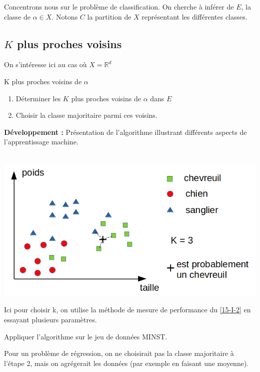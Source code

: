 Concentrons nous sur le problème de classification. On cherche à inférer de $E$, la classe de $\alpha \in X$. Notons $C$ la partition de $X$ représentant les différentes classes.

\subsection{$K$ plus proches voisins}

On s'intéresse ici au cas où $X = \mathbb R^d$

\begin{algo}
	K plus proches voisins de $\alpha$
	\begin{enumerate}
		\item Déterminer les $K$ plus proches voisins de $\alpha$ dans $E$
		\item Choisir la classe majoritaire parmi ces voisins.
	\end{enumerate}
\end{algo}

\textbf{Développement :} Présentation de l'algorithme illustrant différents aspects de l'apprentissage machine.

\begin{example}\enspace\\
	\includegraphics[width=0.6\linewidth]{lecon/15-ml/graphe.png}
\end{example}

\begin{rem}
	Ici pour choisir k, on utilise la méthode de mesure de performance du \ref{15-I-2} en essayant plusieurs paramètres.
\end{rem}

\begin{exercise}
	Appliquer l'algorithme sur le jeu de données MINST.
\end{exercise}

\begin{rem}
	Pour un problème de régression, on ne choisirait pas la classe majoritaire à l'étape 2, mais on agrégerait les données (par exemple en faisant une moyenne).
\end{rem}

